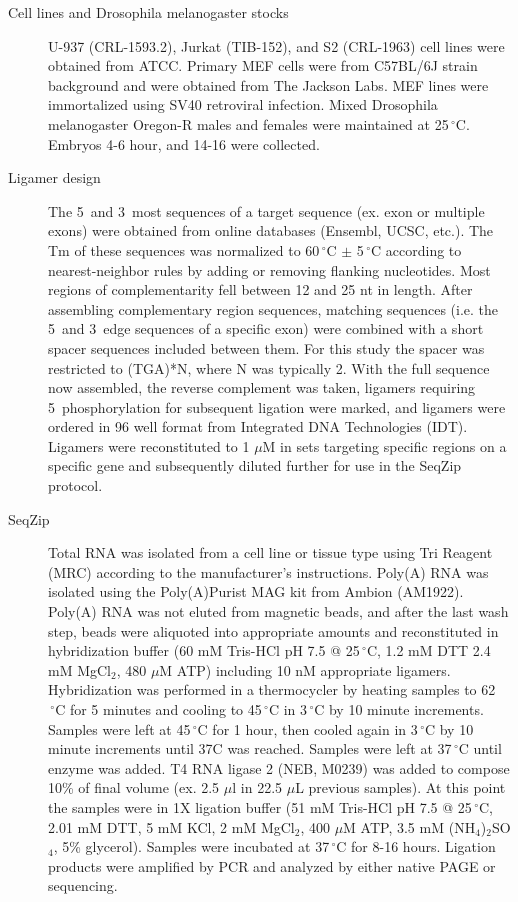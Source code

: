   \begin{description}
  	\item[Cell lines and Drosophila melanogaster stocks] \hfill 
		
		U-937 (CRL-1593.2), Jurkat (TIB-152), and S2 (CRL-1963) cell lines were obtained from ATCC. Primary MEF cells were from C57BL/6J strain background and were obtained from The Jackson Labs. MEF lines were immortalized using SV40 retroviral infection. Mixed Drosophila melanogaster Oregon-R males and females were maintained at 25$\,^{\circ}\mathrm{C}$. Embryos 4-6 hour, and 14-16 were collected. 

		\item[Ligamer design] 
		The 5\textprime~and 3\textprime~most sequences of a target sequence (ex. exon or multiple exons) were obtained from online databases (Ensembl, UCSC, etc.). The Tm of these sequences was normalized to 60$\,^{\circ}\mathrm{C}$ $\pm$ 5$\,^{\circ}\mathrm{C}$ according to nearest-neighbor rules \citep{Xia1998} by adding or removing flanking nucleotides. Most regions of complementarity fell between 12 and 25 nt in length. After assembling complementary region sequences, matching sequences (i.e. the 5\textprime~and 3\textprime~edge sequences of a specific exon) were combined with a short spacer sequences included between them. For this study the spacer was restricted to (TGA)*N, where N was typically 2. With the full sequence now assembled, the reverse complement was taken, ligamers requiring 5\textprime~phosphorylation for subsequent ligation were marked, and ligamers were ordered in 96 well format from Integrated DNA Technologies (IDT). Ligamers were reconstituted to 1 $\mu$M in sets targeting specific regions on a specific gene and subsequently diluted further for use in the SeqZip protocol.

		\item[SeqZip] 
		Total RNA was isolated from a cell line or tissue type using Tri Reagent (MRC) according to the manufacturer's instructions. Poly(A) RNA was isolated using the Poly(A)Purist MAG kit from Ambion (AM1922). Poly(A) RNA was not eluted from magnetic beads, and after the last wash step, beads were aliquoted into appropriate amounts and reconstituted in hybridization buffer (60 mM Tris-HCl pH 7.5 @ 25$\,^{\circ}\mathrm{C}$, 1.2 mM DTT 2.4 mM MgCl$_{2}$, 480 $\mu$M ATP) including 10 nM appropriate ligamers. Hybridization was performed in a thermocycler by heating samples to 62$\,^{\circ}\mathrm{C}$ for 5 minutes and cooling to 45$\,^{\circ}\mathrm{C}$ in 3$\,^{\circ}\mathrm{C}$ by 10 minute increments. Samples were left at 45$\,^{\circ}\mathrm{C}$ for 1 hour, then cooled again in 3$\,^{\circ}\mathrm{C}$ by 10 minute increments until 37C was reached. Samples were left at 37$\,^{\circ}\mathrm{C}$ until enzyme was added. T4 RNA ligase 2 (NEB, M0239) was added to compose 10\% of final volume (ex. 2.5 $\mu$l in 22.5 $\mu$L previous samples). At this point the samples were in 1X ligation buffer (51 mM Tris-HCl pH 7.5 @ 25$\,^{\circ}\mathrm{C}$, 2.01 mM DTT, 5 mM KCl, 2 mM MgCl$_{2}$, 400 $\mu$M ATP, 3.5 mM (NH$_{4}$)$_{2}$SO$_{4}$, 5\% glycerol). Samples were incubated at 37$\,^{\circ}\mathrm{C}$ for 8-16 hours. Ligation products were amplified by PCR and analyzed by either native PAGE or sequencing.


\end{description}
